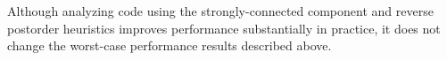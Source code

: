 \documentclass[11pt]{article}
\begin{document}
Although analyzing code using the strongly-connected component and reverse
postorder heuristics improves performance substantially in practice, it does not
change the worst-case performance results described above.

\end{document}
